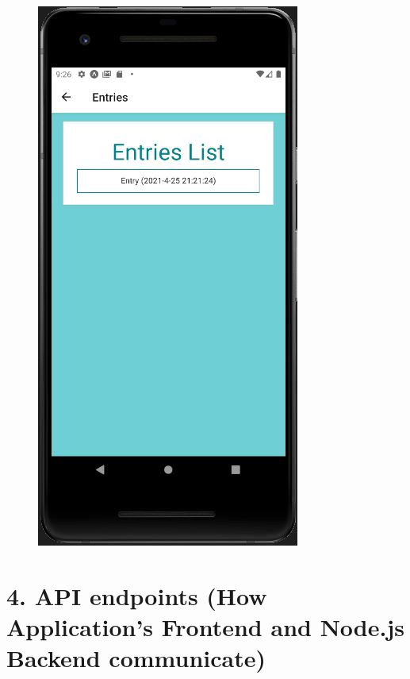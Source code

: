 \documentclass[]{book}
\begin{document}
\begin{figure}
\centering
\includegraphics{./phone_app_doc_images/entries_page.JPG}
\caption{}
\end{figure}

\section{4. API endpoints (How Application's Frontend and Node.js
Backend
communicate)}\label{api-endpoints-how-applications-frontend-and-node.js-backend-communicate}
\end{document}
